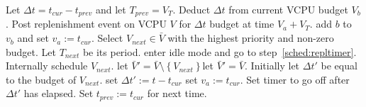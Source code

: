 \documentclass{article}
\newcommand\set[1]{\left\{ {#1} \right\}}
\begin{document}
\begin{algorithm}
  \begin{algorithmic}[1]
    \STATE Let $\Delta t=t_{cur}-t_{prev}$ and let $T_{prev}=V_T$.
    \STATE Deduct $\Delta t$ from current VCPU budget $V_b$.
    \STATE Post replenishment event on VCPU $V$ for $\Delta t$ budget at
    time $V_a+V_T$.
    \STATE add $b$ to $v_b$ and set $v_a:=t_{cur}$.
    \ENDIF
    \ENDFOR
    \ENDFOR
    \STATE Select $V_{next}\in\bar V$ with the highest priority and
    non-zero budget.  Let $T_{next}$ be its period.
     \STATE enter idle mode
    and go to step~\ref{sched:repltimer}.\ENDIF
    \STATE Internally schedule $V_{next}$.
    \STATE let $\bar V'=\bar
    V\setminus\set{V_{next}}$\ELSE\STATE let $\bar V'=\bar V$.\ENDIF
    \STATE Initially let $\Delta t'$ be equal to the budget of
    $V_{next}$.
    \STATE set $\Delta t':= t - t_{cur}$\ENDIF
    \ENDFOR
    \ENDFOR
    \STATE set $v_a:=t_{cur}$.\ENDIF
    \ENDFOR
    \STATE Set timer to go off after $\Delta t'$ has elapsed.
    \STATE Set $t_{prev}:=t_{cur}$ for next time.
  \end{algorithmic}
\end{algorithm}
\end{document}
